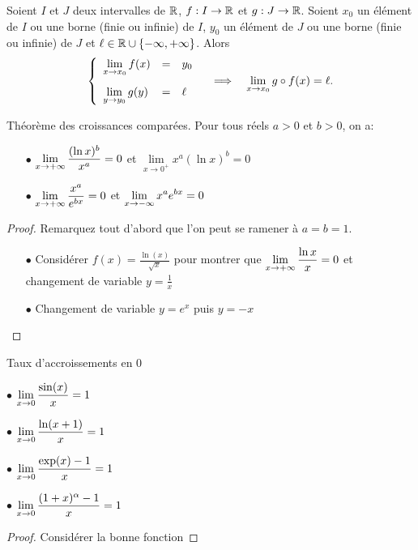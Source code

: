 \documentclass[a4paper, 11pt]{article}
\begin{document}
\begin{prop}
Soient $I$ et $J$ deux intervalles de $\mathbb{R}$, $f: I\rightarrow \mathbb{R}$ et $g: J\rightarrow \mathbb{R}$. Soient $x_0$ un \'el\'ement de $I$ ou une borne (finie ou infinie) de $I$, $y_0$ un \'el\'ement de $J$ ou une borne (finie ou infinie) de $J$ et $\ell\in\mathbb{R}\cup\lbrace -\infty,+\infty\rbrace$. Alors 
$$\left\lbrace \begin{array}{lll}
\lim\limits_{x\to x_0} f(x)&=&y_0 \vsec\\
\lim\limits_{y\to y_0} g(y)&=&\ell
\end{array}\right. \quad 
\Longrightarrow \quad \lim\limits_{x\to x_0} g\circ f(x)=\ell.$$
\end{prop}


\begin{theorem} Th\'eor\`eme des croissances compar\'ees. Pour tous r\'eels $a>0$ et $b>0$, on a: 
\begin{itemize}
\item[$\bullet$] $\lim\limits_{x\to +\infty}\displaystyle\frac{(\ln{x})^b}{x^a}= 0$ \hspace{3cm}et \quad $\lim\limits_{x\to 0^+}x^a(\ln{x})^b= 0$\vsec
\item[$\bullet$]  $\lim\limits_{x\to +\infty} \displaystyle \frac{x^{a}}{e^{bx}} = 0$ \hspace{3.2cm}et \quad $\lim\limits_{x\to -\infty} \displaystyle x^a e^{bx} = 0$\vsec
\end{itemize}
\end{theorem}

\begin{proof}
Remarquez tout d'abord que l'on peut se ramener à $a=b=1$.
    \begin{itemize}
        \item[$\bullet$] Considérer $f(x) = \frac{\ln(x)}{\sqrt{x}}$ pour montrer que $\lim\limits_{x\to +\infty}\displaystyle\frac{\ln{x}}{x}= 0$ et changement de variable $y=\frac{1}{x}$

         \item[$\bullet$] Changement de variable $y=e^x$ puis $y=-x$
    \end{itemize}
\end{proof}

\begin{prop} Taux d'accroissements en 0
\begin{itemize}
\begin{minipage}{0.4\textwidth}
   \item[$\bullet$] $\displaystyle\lim_{x\rightarrow0} \frac{\sin(x)}{x}= 1$ 
\item[$\bullet$] $\displaystyle\lim_{x\rightarrow0} \frac{\ln(x+1)}{x}= 1$ 
\end{minipage}
\begin{minipage}{0.4\textwidth}
\item[$\bullet$] $\displaystyle\lim_{x\rightarrow0} \frac{\exp(x)-1}{x}= 1$
\item[$\bullet$] $\displaystyle\lim_{x\rightarrow0} \frac{(1+x)^{\alpha}-1 }{x}= 1$
\end{minipage}

\end{itemize}
\end{prop}
\begin{proof}
    Considérer la bonne fonction 
\end{proof}
\end{document}
